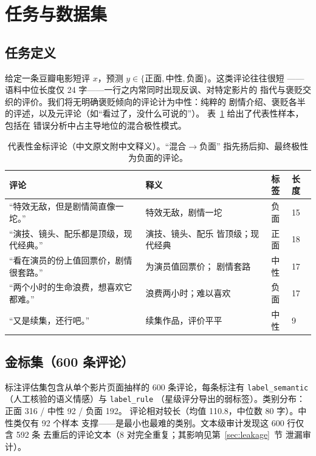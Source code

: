 \documentclass[11pt,a4paper]{article}
\newcommand{\code}[1]{\texttt{#1}}
\begin{document}
\section{任务与数据集}
\label{sec:data}

\subsection{任务定义}

给定一条豆瓣电影短评 $x$，预测
$y \in \{\text{正面}, \text{中性}, \text{负面}\}$。这类评论往往很短
——语料中位长度仅 24 字——一行之内常同时出现反讽、对特定影片的
指代与褒贬交织的评价。我们将无明确褒贬倾向的评论计为中性：纯粹的
剧情介绍、褒贬各半的评述，以及元评论（如“看过了，没什么可说的”）。
表~\ref{tab:examples} 给出了代表性样本，包括在
错误分析中占主导地位的混合极性模式。

\begin{table}[H]
\centering\small
\caption{代表性金标评论（中文原文附中文释义）。``混合$\to$负面''
指先扬后抑、最终极性为负面的评论。}
\label{tab:examples}
\begin{tabular}{p{5.6cm}p{5.4cm}cl}
\toprule
评论 & 释义 & 标签 & 长度 \\
\midrule
``特效无敌，但是剧情简直像一坨。'' & 特效无敌，剧情一坨
& 负面 & 15 \\
``演技、镜头、配乐都是顶级，现代经典。'' & 演技、镜头、配乐
皆顶级；现代经典 & 正面 & 18 \\
``看在演员的份上值回票价，剧情很套路。'' & 为演员值回票价；
剧情套路 & 中性 & 17 \\
``两个小时的生命浪费，想喜欢它都难。'' & 浪费两小时；难以喜欢
& 负面 & 17 \\
``又是续集，还行吧。'' & 续集作品，评价平平 & 中性 & 9 \\
\bottomrule
\end{tabular}
\end{table}

\subsection{金标集（600 条评论）}

标注评估集包含从单个影片页面抽样的 600 条评论，每条标注有
\code{label\_semantic}（人工核验的语义情感）与 \code{label\_rule}
（星级评分导出的弱标签）。类别分布：正面 316 / 中性 92 / 负面 192。
评论相对较长（均值 110.8，中位数 80 字）。中性类仅有 92 个样本
支撑——是最小也最难的类别。文本级审计发现这 600 行仅含 592 条
去重后的评论文本（8 对完全重复；其影响见第~\ref{sec:leakage}~节
泄漏审计）。
\end{document}
